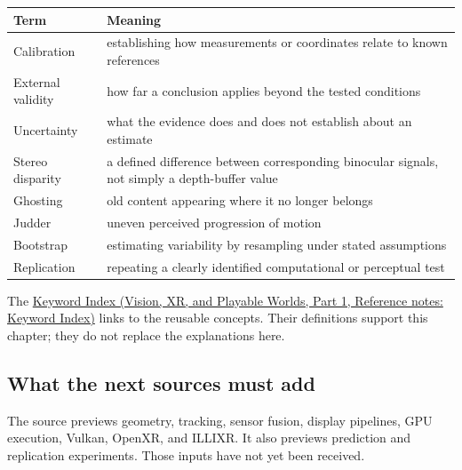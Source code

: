 {\def\LTcaptype{none} %
\begin{longtable}[]{@{}
  >{\raggedright\arraybackslash}p{}
  >{\raggedright\arraybackslash}p{}@{}}
\toprule\noalign{}
\begin{minipage}[b]{\linewidth}\raggedright
Term
\end{minipage} & \begin{minipage}[b]{\linewidth}\raggedright
Meaning
\end{minipage} \\
\midrule\noalign{}
\endhead
\bottomrule\noalign{}
\endlastfoot
Calibration & establishing how measurements or coordinates relate to known references \\
External validity & how far a conclusion applies beyond the tested conditions \\
Uncertainty & what the evidence does and does not establish about an estimate \\
Stereo disparity & a defined difference between corresponding binocular signals, not simply a depth-buffer value \\
Ghosting & old content appearing where it no longer belongs \\
Judder & uneven perceived progression of motion \\
Bootstrap & estimating variability by resampling under stated assumptions \\
Replication & repeating a clearly identified computational or perceptual test \\
\end{longtable}
}

The \href{../07-Vision-XR-and-Playable-Worlds-P01/main.pdf\#nameddest=appendix-a6d556a4ef50}{Keyword Index (Vision, XR, and Playable Worlds, Part 1, Reference notes: Keyword Index)} links to the reusable concepts. Their definitions support this chapter; they do not replace the explanations here.

\subsection{What the next sources must add}\label{04-visual-computing-ii-ch043-what-the-next-sources-must-add}

\hypertarget{04-visual-computing-ii-ch043-what-the-next-sources-must-add}{}

The source previews geometry, tracking, sensor fusion, display pipelines, GPU execution, Vulkan, OpenXR, and ILLIXR. It also previews prediction and replication experiments. Those inputs have not yet been received.

